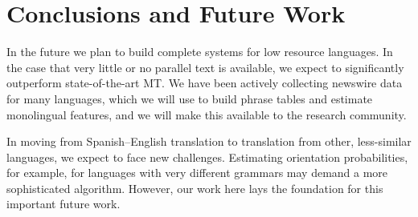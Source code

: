 \documentclass[11pt]{article}
\begin{document}







\section{Conclusions and Future Work} \label{sect:conc}

In the future we plan to build complete systems for low resource languages. In the case that very little or no parallel text is available, we expect to significantly outperform state-of-the-art MT. We have been actively collecting newswire data for many languages, which we will use to build phrase tables and estimate monolingual features, and we will make this available to the research community.

In moving from Spanish--English translation to translation from other, less-similar languages, we expect to face new challenges. Estimating orientation probabilities, for example, for languages with very different grammars may demand a more sophisticated algorithm. However, our work here lays the foundation for this important future work.
\end{document}
